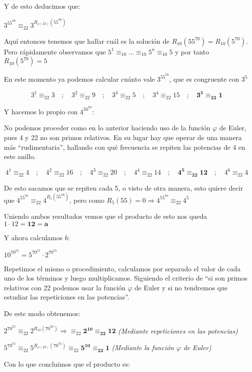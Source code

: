 \documentclass[11pt, a4paper, titlepage]{article}
\begin{document}
Y de esto deducimos que:

$3^{55^{70}} \equiv_{22} 3^{R_{\varphi(22)}(55^{70})}$

Aquí entonces tenemos que hallar cuál es la solución de $R_{10}(55^{70}) = R_{10}(5^{70}).$
Pero rápidamente observamos que $5^1\equiv_{10}...\equiv_{10}5^n\equiv_{10}5$
 y por tanto $R_{10}(5^{70}) = 5$
 
En este momento ya podemos calcular cuánto vale $3^{55^{70}}$, que es congruente con $3^5$

$$3^1\equiv_{22}3\quad;\quad3^2\equiv_{22}9\quad;\quad3^3\equiv_{22}5\quad;\quad3^4\equiv_{22}15\quad;\quad \mathbf{3^5\equiv_{22}1}$$

Y hacemos lo propio con $4^{50^{70}}$:

No podemos proceder como en lo anterior haciendo uso de la función $\varphi$ de Euler, pues 4 y 22 no son primos relativos. En su lugar hay que operar de una manera más “rudimentaria”, hallando con qué frecuencia se repiten las potencias de 4 en este anillo.

$$4^1\equiv_{22}4\quad;\quad 4^2\equiv_{22}16\quad;\quad 4^3\equiv_{22}20\quad;\quad 4^4\equiv_{22}14\quad;\quad\mathbf{4^5\equiv_{22}12}\quad;\quad 4^6\equiv_{22}4$$

De esto sacamos que se repiten cada 5, o visto de otra manera, esto quiere decir que $4^{55^{70}}\equiv_{22} 4^{R_5(55^{70})} $, pero como $R_5(55) = 0 \Rightarrow 4^{55^{70}}\equiv_{22} 4^5$

Uniendo ambos resultados vemos que el producto de esto nos queda $1\cdot 12 = \mathbf{12 = a}$ 


Y ahora calculamos $b$:

$10^{70^{55}} = 5^{70^{55}} \cdot 2^{70^{55}}$

Repetimos el mismo o procedimiento, calculamos por separado el valor de cada uno de los términos y luego multiplicamos. Siguiendo el criterio de “si son primos relativos con 22 podemos usar la función $\varphi$ de Euler y si no tendremos que estudiar las repeticiones en las potencias”.

De este modo obtenemos:

$2^{70^{55}} \equiv_{22}2^{R_{10}(70^{50})} \Rightarrow \equiv_{22}\mathbf{2^{10}\equiv_{22}12}$ \emph{(Mediante repeticiones en las potencias)}

$5^{70^{55}}\equiv_{22}5^{R_{\varphi(22)}(70^{55})}\equiv_{22}\mathbf{5^{10}\equiv_{22}1}$ \emph{(Mediante la función $\varphi$ de Euler)}

Con lo que concluimos que el producto es:
\end{document}
